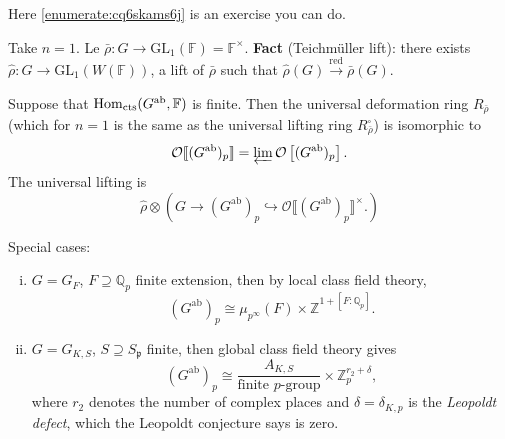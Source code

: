 \documentclass[reqno]{amsart} 
\begin{document}
Here \eqref{enumerate:cq6skams6j} is an exercise you can do.

\begin{example}
  Take $n = 1$.  Le $\bar{\rho} : G \rightarrow \mathrm{GL}_1(\mathbb{F}) = \mathbb{F}^\times$.  \textbf{Fact} (Teichmüller lift): there exists $\hat{\rho} : G \rightarrow \mathrm{GL}_1(W(\mathbb{F}))$, a lift of $\bar{\rho}$ such that $\hat{\rho}(G) \xrightarrow{\mathrm{red}} \bar{\rho}(G)$.
\end{example}
\begin{exercise}
  Suppose that $\operatorname{Hom}_{\mathrm{cts}}(G^{\mathrm{ab}}, \mathbb{F})$ is finite.  Then the universal deformation ring $R_{\bar{\rho}}$ (which for $n = 1$ is the same as the universal lifting ring $R_{\bar{\rho}}^{\square}$)  is isomorphic to
  \begin{equation*}
    \mathcal{O} \llbracket(G^{\mathrm{ab}})_p \rrbracket = \varprojlim
    \mathcal{O} \left[(G^{\mathrm{a b}})_p \right].    
  \end{equation*}
  The universal lifting is
  \begin{equation*}
    \hat{\rho} \otimes \left( G \rightarrow(G^{\mathrm{a b}})_p
      \hookrightarrow
      \mathcal{O} \llbracket(G^{\mathrm{a b}})_p \rrbracket^\times.
    \right)
  \end{equation*}
\end{exercise}
Special cases:
\begin{enumerate}[(i)]
\item\label{enumerate:cq6skmixcf} $G = G_F$, $F \supseteq \mathbb{Q}_p$ finite extension, then by local class field theory,
  \begin{equation*}
    (G^{\mathrm{a b}})_p \cong \mu_{p^\infty}(F) \times \mathbb{Z}^{1 +[F : \mathbb{Q}_p]}.
  \end{equation*}
\item\label{enumerate:cq6skmix6w} $G = G_{K, S}$, $S \supseteq S_{\mathfrak{p}}$ finite, then global class field theory gives
  \begin{equation*}
    (G^{\mathrm{a b}})_p \cong \frac{A_{K, S}}{\text{finite $p$-group}}
    \times \mathbb{Z}_p^{r_2 + \delta},
  \end{equation*}
  where $r_2$ denotes the number of complex places and $\delta = \delta_{K, p}$ is the \emph{Leopoldt defect}, which the Leopoldt conjecture says is zero.
\end{enumerate}
\end{document}
